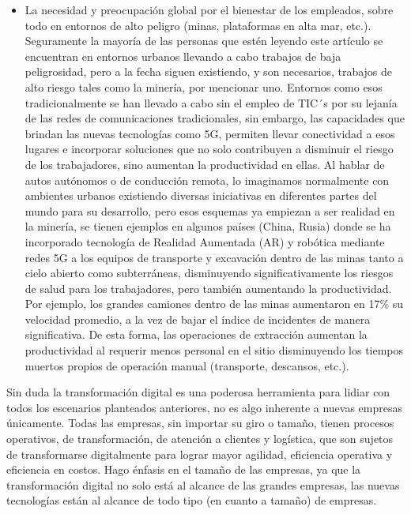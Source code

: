 \documentclass[12pt]{article}
\begin{document}
\begin{itemize}
    \item La necesidad y preocupación global por el bienestar de los empleados, sobre todo en entornos de alto peligro (minas, plataformas en alta mar, etc.). Seguramente la mayoría de las personas que estén leyendo este artículo se encuentran en entornos urbanos llevando a cabo trabajos de baja peligrosidad, pero a la fecha siguen existiendo, y son necesarios, trabajos de alto riesgo tales como la minería, por mencionar uno. Entornos como esos tradicionalmente se han llevado a cabo sin el empleo de TIC´s por su lejanía de las redes de comunicaciones tradicionales, sin embargo, las capacidades que brindan las nuevas tecnologías como 5G, permiten llevar conectividad a esos lugares e incorporar soluciones que no solo contribuyen a disminuir el riesgo de los trabajadores, sino aumentan la productividad en ellas. Al hablar de autos autónomos o de conducción remota, lo imaginamos normalmente con ambientes urbanos existiendo diversas iniciativas en diferentes partes del mundo para su desarrollo, pero esos esquemas ya empiezan a ser realidad en la minería, se tienen ejemplos en algunos países (China, Rusia) donde se ha incorporado tecnología de Realidad Aumentada (AR) y robótica mediante redes 5G a los equipos de transporte y excavación dentro de las minas tanto a cielo abierto como subterráneas, disminuyendo significativamente los riesgos de salud para los trabajadores, pero también aumentando la productividad. Por ejemplo, los grandes camiones dentro de las minas aumentaron en 17\% su velocidad promedio, a la vez de bajar el índice de incidentes de manera significativa. De esta forma, las operaciones de extracción aumentan la productividad al requerir menos personal en el sitio disminuyendo los tiempos muertos propios de operación manual (transporte, descansos, etc.).
\end{itemize}

Sin duda la transformación digital es una poderosa herramienta para lidiar con todos los escenarios planteados anteriores, no es algo inherente a nuevas empresas únicamente. Todas las empresas, sin importar su giro o tamaño, tienen procesos operativos, de transformación, de atención a clientes y logística, que son sujetos de transformarse digitalmente para lograr mayor agilidad, eficiencia operativa y eficiencia en costos. Hago énfasis en el tamaño de las empresas, ya que la transformación digital no solo está al alcance de las grandes empresas, las nuevas tecnologías están al alcance de todo tipo (en cuanto a tamaño) de empresas.
\end{document}

